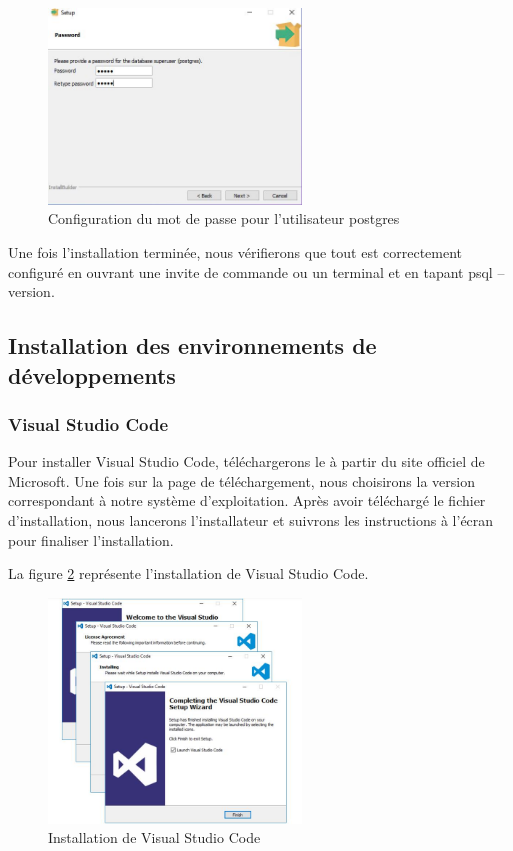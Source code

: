 \documentclass[12pt]{report}
\begin{document}
			\begin{figure}[h]
				\centering
				\includegraphics[width=0.6\textwidth]{postgreMDP.jpg}
				\caption{Configuration du mot de passe pour l'utilisateur postgres}
				\label{fig:postgreMDP}
			\end{figure}
			\FloatBarrier
	
			Une fois l'installation terminée, nous vérifierons que tout est correctement configuré en ouvrant une invite de commande ou un terminal et en tapant psql --version.

			\subsection{Installation des environnements de développements}
			
			\subsubsection{Visual Studio Code}

			\hspace{15pt} Pour installer Visual Studio Code, téléchargerons le à partir du site officiel de Microsoft. Une fois sur la page de téléchargement, nous choisirons la version correspondant à notre système d'exploitation.
			 Après avoir téléchargé le fichier d'installation, nous lancerons l'installateur et suivrons les instructions à l'écran pour finaliser l'installation.
			
			La figure \ref{fig:vscode} représente l’installation de Visual Studio Code.
			
			\begin{figure}[h]
				\centering
				\includegraphics[width=0.6\textwidth]{vscode.png}
				\caption{Installation de Visual Studio Code}
				\label{fig:vscode}
			\end{figure}
			\FloatBarrier
\end{document}
